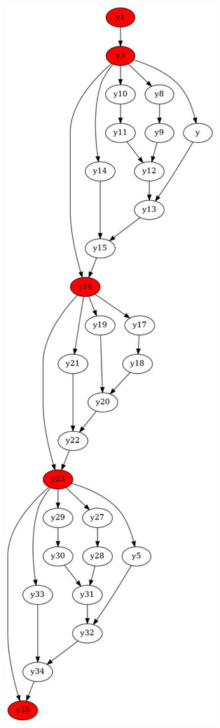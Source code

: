 \documentclass[../diploma.tex]{subfiles}
\begin{document}
\begin{figure}[h]
    \begin{subfigure}{0.24\textwidth}
    \includegraphics[width=0.9\linewidth]{graph_simple2.jpeg} 

\end{subfigure}
\end{figure}
\end{document}
